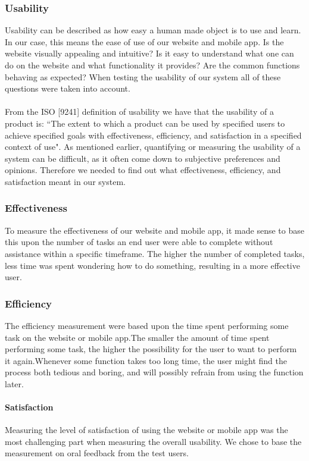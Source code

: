 \subsubsection{Usability} Usability can be described as how easy a human made object is to use and learn. In our case, this means the ease of use of our website and mobile app. Is the website visually appealing and intuitive? Is it easy to understand what one can do on the website and what functionality it provides? Are the common functions behaving as expected? When testing the usability of our system all of these questions were taken into account.

\paragraph{} From the ISO [9241]  definition of usability we have that the usability of a product is:
“The extent to which a product can be used by specified users to achieve specified goals with effectiveness, efficiency, and satisfaction in a specified context of use". As mentioned earlier, quantifying or measuring the usability of a system can be difficult, as it often come down to subjective preferences and opinions. Therefore we needed to find out what effectiveness, efficiency, and satisfaction meant in our system.

\subsubsection{Effectiveness} To measure the effectiveness of our website and mobile app, it made sense to base this upon the number of tasks an end user were able to complete without assistance within a specific timeframe. The higher the number of completed tasks, less time was spent wondering how to do something, resulting in a more effective user. 

\subsubsection{Efficiency} The efficiency measurement were based upon the time spent performing some task on the website or mobile app.The smaller the amount of time spent performing some task, the higher the possibility for the user to want to perform it again.Whenever some function takes too long time, the user might find the process both tedious and boring, and will possibly refrain from using the function later.

\paragraph{Satisfaction} Measuring the level of satisfaction of using the website or mobile app was the most challenging part when measuring the overall usability. We chose to base the measurement on oral feedback from the test users.

